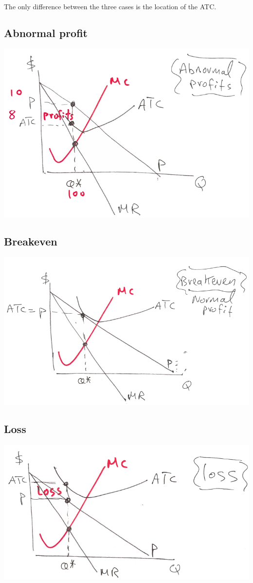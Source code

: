 \documentclass[../ECON-281-Notes.tex]{subfiles}
\begin{document}
The only difference between the three cases is the location of the ATC.
\subsection{Abnormal profit}
\includegraphics[width=\columnwidth]{assets/image_2021-11-23-12-10-51.png}

\subsection{Breakeven}
\includegraphics[width=\columnwidth]{assets/image_2021-11-23-12-11-32.png}

\subsection{Loss}
\includegraphics[width=\columnwidth]{assets/image_2021-11-23-12-11-51.png}
\end{document}
